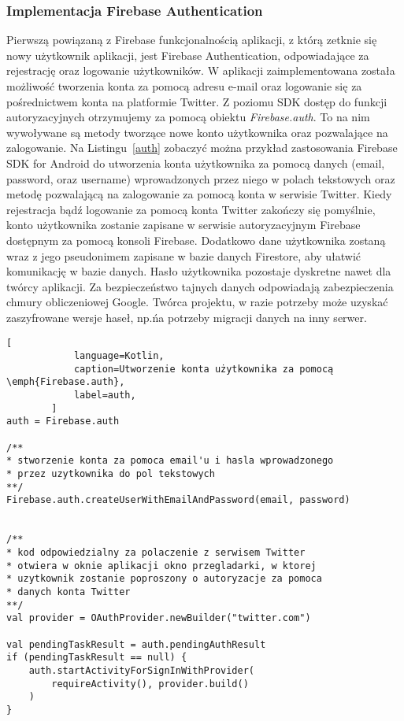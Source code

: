         \subsubsection{Implementacja Firebase Authentication}
        Pierwszą powiązaną z Firebase funkcjonalnością aplikacji, z którą zetknie się nowy użytkownik aplikacji, jest Firebase Authentication, odpowiadające za rejestrację oraz logowanie użytkowników.
        W aplikacji zaimplementowana została możliwość tworzenia konta za pomocą adresu e-mail oraz logowanie się za pośrednictwem konta na platformie Twitter. Z poziomu SDK dostęp do funkcji autoryzacyjnych
        otrzymujemy za pomocą obiektu \emph{Firebase.auth}. To na nim wywoływane są metody tworzące nowe konto użytkownika oraz pozwalające na zalogowanie. Na Listingu~\ref{auth} zobaczyć można przykład
        zastosowania Firebase SDK for Android do utworzenia konta użytkownika za pomocą danych (email, password, oraz username) wprowadzonych przez niego w polach tekstowych oraz metodę pozwalającą
        na zalogowanie za pomocą konta w serwisie Twitter. Kiedy rejestracja bądź logowanie za pomocą konta Twitter zakończy się pomyślnie, konto użytkownika zostanie zapisane w serwisie autoryzacyjnym
        Firebase dostępnym za pomocą konsoli Firebase. Dodatkowo dane użytkownika zostaną wraz z jego pseudonimem zapisane w bazie danych Firestore, aby ułatwić komunikację w bazie danych.
        Hasło użytkownika pozostaje dyskretne nawet dla twórcy aplikacji. Za bezpieczeństwo tajnych danych odpowiadają zabezpieczenia chmury obliczeniowej Google. Twórca projektu, w razie potrzeby
        może uzyskać zaszyfrowane wersje haseł, np.\' na potrzeby migracji danych na inny serwer.

\newpage
        \begin{lstlisting}[
            language=Kotlin, 
            caption=Utworzenie konta użytkownika za pomocą \emph{Firebase.auth}, 
            label=auth,
        ]
auth = Firebase.auth

/** 
* stworzenie konta za pomoca email'u i hasla wprowadzonego 
* przez uzytkownika do pol tekstowych 
**/
Firebase.auth.createUserWithEmailAndPassword(email, password)


/**
* kod odpowiedzialny za polaczenie z serwisem Twitter
* otwiera w oknie aplikacji okno przegladarki, w ktorej
* uzytkownik zostanie poproszony o autoryzacje za pomoca
* danych konta Twitter 
**/
val provider = OAuthProvider.newBuilder("twitter.com")

val pendingTaskResult = auth.pendingAuthResult
if (pendingTaskResult == null) {
    auth.startActivityForSignInWithProvider(
        requireActivity(), provider.build()
    )
}
        \end{lstlisting}
        \vspace{1cm}


